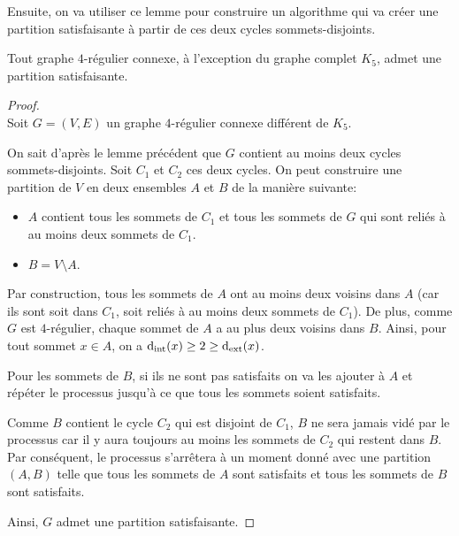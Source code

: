 Ensuite, on va utiliser ce lemme pour construire un algorithme qui va créer une partition satisfaisante à partir de ces deux cycles sommets-disjoints.

\begin{theorem}
    Tout graphe \(4\)-régulier connexe, à l'exception du graphe complet \(K_5\), admet une partition satisfaisante.
\end{theorem}

\begin{proof}\,\\
    Soit \(G=(V,E)\) un graphe \(4\)-régulier connexe différent de \(K_5\).

    On sait d'après le lemme précédent que \(G\) contient au moins deux cycles sommets-disjoints. Soit \(C_1\) et \(C_2\) ces deux cycles. On peut construire une partition de \(V\) en deux ensembles \(A\) et \(B\) de la manière suivante:
    \begin{itemize}
        \item \(A\) contient tous les sommets de \(C_1\) et tous les sommets de \(G\) qui sont reliés à au moins deux sommets de \(C_1\).
        \item \(B = V \setminus A\).
    \end{itemize}

    Par construction, tous les sommets de \(A\) ont au moins deux voisins dans \(A\) (car ils sont soit dans \(C_1\), soit reliés à au moins deux sommets de \(C_1\)). De plus, comme \(G\) est \(4\)-régulier, chaque sommet de \(A\) a au plus deux voisins dans \(B\). Ainsi, pour tout sommet \(x \in A\), on a \(\operatorname{d_{\mathrm{int}}}(x) \geq 2 \geq \operatorname{d_{\mathrm{ext}}}(x)\).

    Pour les sommets de \(B\), si ils ne sont pas satisfaits on va les ajouter à \(A\) et répéter le processus jusqu'à ce que tous les sommets soient satisfaits. 

    Comme \(B\) contient le cycle \(C_2\) qui est disjoint de \(C_1\), \(B\) ne sera jamais vidé par le processus car il y aura toujours au moins les sommets de \(C_2\) qui restent dans \(B\). Par conséquent, le processus s'arrêtera à un moment donné avec une partition \((A, B)\) telle que tous les sommets de \(A\) sont satisfaits et tous les sommets de \(B\) sont satisfaits.

    Ainsi, \(G\) admet une partition satisfaisante.
\end{proof}


